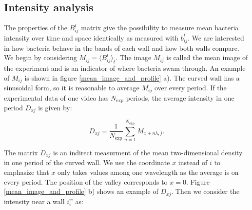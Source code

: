 \subsection{Intensity analysis}

The properties of the $B_{ij}^t$ matrix give the possibility to measure mean bacteria intensity over time and space identically as measured with $ b_{ij}^t$. We are interested in how bacteria behave in the bands of each wall and how both walls compare. We begin by considering $M_{ij} = \langle B_{ij}^t \rangle_t $. The image $M_{ij}$ is called the mean image of the experiment and is an indicator of where bacteria swam through. An example of $M_{ij}$ is shown in figure \ref{mean_image_and_profile} a). The curved wall has a sinusoidal form, so it is reasonable to average $M_{ij}$ over every period. If the experimental data of one video has $N_{\text{exp}}$ periods, the average intensity in one period $D_{xj}$ is given by:


\begin{equation} \label{eq:2d density}
	D_{xj} = \frac{1}{N_{\text{exp}}} \sum_{n=1}^{N_{\text{exp}}} M_{x+ n\lambda,j}.
\end{equation}

The matrix $D_{xj}$ is an indirect measurment of the mean two-dimensional density in one period of the curved wall. We use the coordinate $x$ instead of $i$ to emphasize that $x$ only takes values among one wavelength as the average is on every period. The position of the valley corresponds to $x=0$. Figure \ref{mean_image_and_profile} b) shows an example of $D_{xj}$. Then we consider the intensity near a wall $i_i^w$ as:

